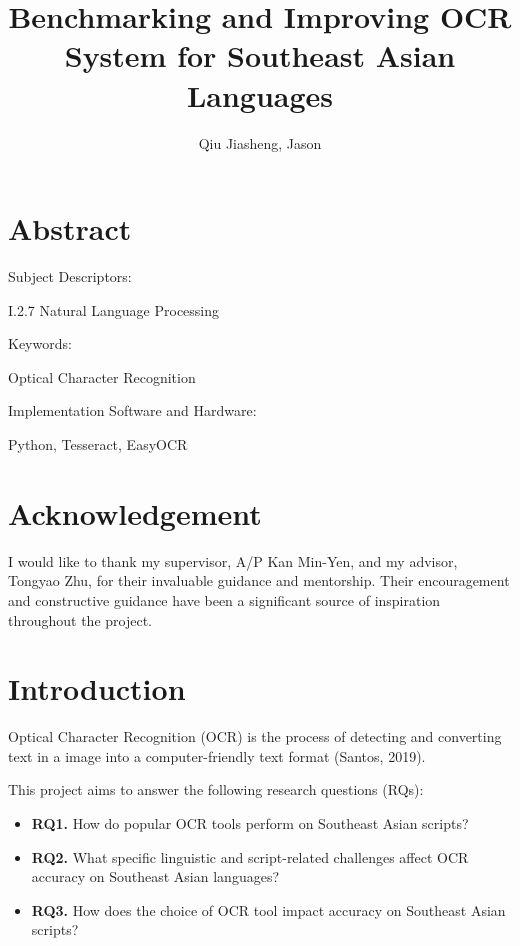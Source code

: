 \documentclass[12pt,oneside]{memoir}
\title{Benchmarking and Improving OCR System for Southeast Asian Languages}
\author{Qiu Jiasheng, Jason}
\begin{document}
\frontmatter

\pagestyle{plain}

\makecover

\setcounter{page}{1}

\maketitle

\chapter{Abstract}
\lipsum[1]

\vspace{0.3in}
Subject Descriptors:
\begin{adjustwidth}{0.7in}{}
    I.2.7 Natural Language Processing
\end{adjustwidth}

Keywords:
\begin{adjustwidth}{0.7in}{}
    Optical Character Recognition
\end{adjustwidth}

Implementation Software and Hardware:
\begin{adjustwidth}{0.7in}{}
    Python, Tesseract, EasyOCR
\end{adjustwidth}

\chapter{Acknowledgement}
I would like to thank my supervisor, A/P Kan Min-Yen, and my advisor, Tongyao Zhu, for their invaluable guidance and mentorship. Their encouragement and constructive guidance have been a significant source of inspiration throughout the project.

\listoftables

\tableofcontents

\mainmatter

\chapter{Introduction}
Optical Character Recognition (OCR) is the process of detecting and converting text in a image into a computer-friendly text format (Santos, 2019).

This project aims to answer the following research questions (RQs):

\begin{itemize}
    \item \textbf{RQ1.} How do popular OCR tools perform on Southeast Asian scripts?
    \item \textbf{RQ2.} What specific linguistic and script-related challenges affect OCR accuracy on Southeast Asian languages?
    \item \textbf{RQ3.} How does the choice of OCR tool impact accuracy on Southeast Asian scripts?
\end{itemize}
\end{document}
